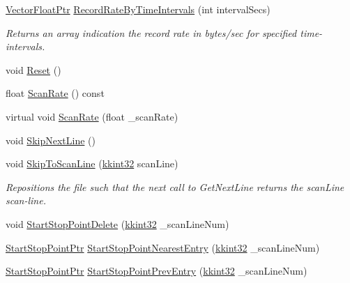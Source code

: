 \begin{DoxyCompactItemize}
\item 
\hyperlink{namespace_k_k_b_a182835040a03db3c21a7ea4e46c84790}{Vector\+Float\+Ptr} \hyperlink{class_k_k_l_s_c_1_1_scanner_file_a292948473fb018ea5278e83929d3dc5b}{Record\+Rate\+By\+Time\+Intervals} (int interval\+Secs)
\begin{DoxyCompactList}\small\item\em Returns an array indication the record rate in bytes/sec for specified time-\/intervals. \end{DoxyCompactList}\item 
void \hyperlink{class_k_k_l_s_c_1_1_scanner_file_a33327f6637cf929f2cc56b12cb7a058a}{Reset} ()
\item 
float \hyperlink{class_k_k_l_s_c_1_1_scanner_file_ab95128a2cbc221f0d930072d55321d63}{Scan\+Rate} () const 
\item 
virtual void \hyperlink{class_k_k_l_s_c_1_1_scanner_file_a713120a99c2a4bc13060dd1daff1260e}{Scan\+Rate} (float \+\_\+scan\+Rate)
\item 
void \hyperlink{class_k_k_l_s_c_1_1_scanner_file_ae48a4e5b304ddf66c28409e76f73c7fd}{Skip\+Next\+Line} ()
\item 
void \hyperlink{class_k_k_l_s_c_1_1_scanner_file_a8e5c5f94b145b4086d60821d144c990d}{Skip\+To\+Scan\+Line} (\hyperlink{namespace_k_k_b_a8fa4952cc84fda1de4bec1fbdd8d5b1b}{kkint32} scan\+Line)
\begin{DoxyCompactList}\small\item\em Repositions the file such that the next call to \textquotesingle{}Get\+Next\+Line\textquotesingle{} returns the \textquotesingle{}scan\+Line\textquotesingle{} scan-\/line. \end{DoxyCompactList}\item 
void \hyperlink{class_k_k_l_s_c_1_1_scanner_file_af7ae38dd58fa6af97d3a480b5cb73f8d}{Start\+Stop\+Point\+Delete} (\hyperlink{namespace_k_k_b_a8fa4952cc84fda1de4bec1fbdd8d5b1b}{kkint32} \+\_\+scan\+Line\+Num)
\item 
\hyperlink{namespace_k_k_l_s_c_ad7242c9e21790e237095cdd24ce21361}{Start\+Stop\+Point\+Ptr} \hyperlink{class_k_k_l_s_c_1_1_scanner_file_a08f8fdbd9246c105965b58a459a9b32e}{Start\+Stop\+Point\+Nearest\+Entry} (\hyperlink{namespace_k_k_b_a8fa4952cc84fda1de4bec1fbdd8d5b1b}{kkint32} \+\_\+scan\+Line\+Num)
\item 
\hyperlink{namespace_k_k_l_s_c_ad7242c9e21790e237095cdd24ce21361}{Start\+Stop\+Point\+Ptr} \hyperlink{class_k_k_l_s_c_1_1_scanner_file_ad4d804a4e60d85e1bf1f02a50064b848}{Start\+Stop\+Point\+Prev\+Entry} (\hyperlink{namespace_k_k_b_a8fa4952cc84fda1de4bec1fbdd8d5b1b}{kkint32} \+\_\+scan\+Line\+Num)

\end{DoxyCompactItemize}
